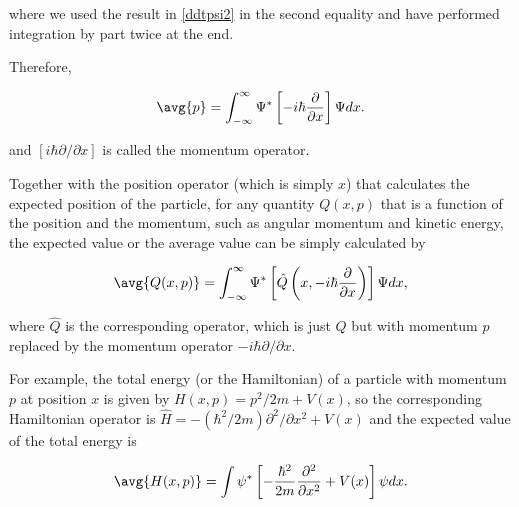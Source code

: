 \documentclass[a4paper,12pt]{report}
\begin{document}
where we used the result in \cref{ddtpsi2} in the second equality and have performed integration by part twice at the end.
	
Therefore,

\begin{equation}
  \avg{p} = \int_{-\infty}^{\infty} \Psi ^* \left[-i\hbar \frac{\partial }{\partial x} \right] \Psi dx.
\end{equation}

and \(\left[i\hbar \partial / \partial x \right]\) is called the momentum operator. 

Together with the position operator (which is simply \(x\)) that calculates the expected position of the particle, for any quantity \(Q(x,p)\) that is a function of the position and the momentum, such as angular momentum and kinetic energy, the expected value or the average value can be simply calculated by 
	
\begin{equation}
  \avg{Q(x,p)} = \int_{-\infty}^{\infty} \Psi ^* \left[\hat{Q} \left(x, -i\hbar \frac{\partial }{\partial x} \right)\right] \Psi dx, \label{expectedvalues} 
\end{equation}

where \(\hat{Q}\) is the corresponding operator, which is just \(Q\) but with momentum \(p\) replaced by the momentum operator \( -i \hbar \partial /\partial x \).   

For example, the total energy (or the Hamiltonian) of a particle with momentum \(p\) at position \(x\) is given by \( H(x,p) = p^2 /2m + V(x) \), so the corresponding Hamiltonian operator is \( \hat{H} = - (\hbar ^2 /2m )\partial ^2 / \partial x^2 +V(x)\) and the expected value of the total energy is 

\begin{equation}
  \avg{H(x,p)} = \int \psi ^* \left[ - \frac{\hbar ^2}{2m}\frac{\partial^2 }{\partial x^2} +V(x) \right]\psi dx. \label{Hamil} 
\end{equation}
\end{document}
